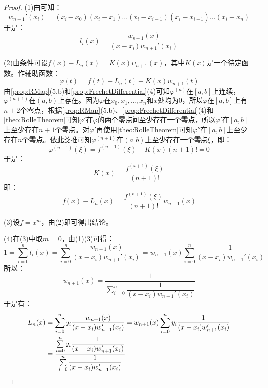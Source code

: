 \begin{proof}
	(1)由可知：
	\begin{equation*}
		w_{n+1}'(x_i)=(x_i-x_0)(x_i-x_1)\dots(x_i-x_{i-1})(x_i-x_{i+1})\dots(x_i-x_n)
	\end{equation*}
	于是：
	\begin{equation*}
		l_i(x)=\frac{w_{n+1}(x)}{(x-x_i)w_{n+1}'(x_i)}
	\end{equation*}\par
	(2)由条件可设$f(x)-L_n(x)=K(x)w_{n+1}(x)$，其中$K(x)$是一个待定函数。作辅助函数：
	\begin{equation*}
		\varphi(t)=f(t)-L_n(t)-K(x)w_{n+1}(t)
	\end{equation*}
	由\cref{prop:RMap}(5.b)和\cref{prop:FrechetDifferential}(4)可知$\varphi^{(n)}$在$[a,b]$上连续，$\varphi^{(n+1)}$在$(a,b)$上存在。因为$\varphi$在$x_0,x_1,\dots,x_n$和$x$处均为$0$，所以$\varphi$在$[a,b]$上有$n+2$个零点，根据\cref{prop:RMap}(5.b)、\cref{prop:FrechetDifferential}(4)和\cref{theo:RolleTheorem}可知$\varphi'$在$\varphi$的两个零点间至少存在一个零点，所以$\varphi'$在$[a,b]$上至少存在$n+1$个零点。对$\varphi'$再使用\cref{theo:RolleTheorem}可知$\varphi''$在$[a,b]$上至少存在$n$个零点。依此类推可知$\varphi^{(n+1)}$在$(a,b)$上至少存在一个零点$\xi$，即：
	\begin{equation*}
		\varphi^{(n+1)}(\xi)=f^{(n+1)}(\xi)-K(x)(n+1)!=0
	\end{equation*}
	于是：
	\begin{equation*}
		K(x)=\frac{f^{(n+1)}(\xi)}{(n+1)!}
	\end{equation*}
	即：
	\begin{equation*}
		f(x)-L_n(x)=\frac{f^{(n+1)}(\xi)}{(n+1)!}w_{n+1}(x)
	\end{equation*}\par
	(3)设$f=x^m$，由(2)即可得出结论。\par
	(4)在(3)中取$m=0$，由(1)(3)可得：
	\begin{equation*}
		1=\sum_{i=0}^{n}l_i(x)=\sum_{i=0}^{n}\frac{w_{n+1}(x)}{(x-x_i)w_{n+1}'(x_i)}=w_{n+1}(x)\sum_{i=0}^{n}\frac{1}{(x-x_i)w_{n+1}'(x_i)}
	\end{equation*}
	所以：
	\begin{equation*}
		w_{n+1}(x)=\frac{1}{\sum\limits_{i=0}^{n}\dfrac{1}{(x-x_i)w_{n+1}'(x_i)}}
	\end{equation*}
	于是有：
	\begin{align*}
		L_n(x)&=\sum_{i=0}^{n}y_i\frac{w_{n+1}(x)}{(x-x_i)w_{n+1}'(x_i)}=w_{n+1}(x)\sum_{i=0}^{n}y_i\frac{1}{(x-x_i)w_{n+1}'(x_i)} \\
		&=\frac{\sum\limits_{i=0}^{n}y_i\dfrac{1}{(x-x_i)w_{n+1}'(x_i)}}{\sum\limits_{i=0}^{n}\dfrac{1}{(x-x_i)w_{n+1}'(x_i)}}\qedhere
	\end{align*}
\end{proof}
